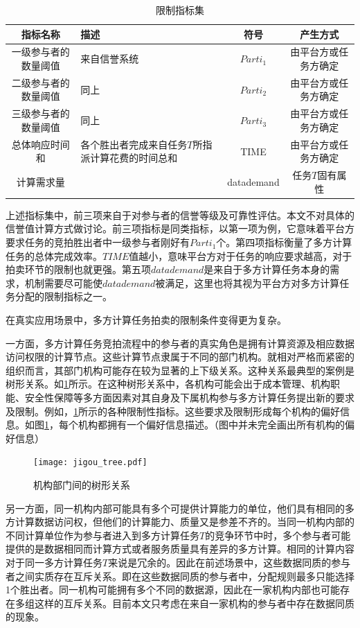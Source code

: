 \documentclass[promaster]{thesis-uestc}
\begin{document}
\begin{table}[h]
\caption{限制指标集}
\label{zhibiao}
\begin{tabular}{cp{10em}cc}
    \toprule
    指标名称& 描述&符号&产生方式\\
    \midrule
    一级参与者的数量阈值&来自信誉系统&$Parti_1$&由平台方或任务方确定\\
    二级参与者的数量阈值& 同上&$Parti_2$&由平台方或任务方确定\\
    三级参与者的数量阈值& 同上&$Parti_3$&由平台方或任务方确定\\
    总体响应时间和&各个胜出者完成来自任务$T$所指派计算花费的时间总和&TIME&由平台方或任务方确定\\
    计算需求量&&datademand&任务$T$固有属性\\
    \bottomrule
\end{tabular}
\end{table}

上述指标集中，前三项来自于对参与者的信誉等级及可靠性评估。本文不对具体的信誉值计算方式做讨论。前三项指标是同类指标，以第一项为例，它意味着平台方要求任务的竞拍胜出者中一级参与者刚好有$Parti_1$个。第四项指标衡量了多方计算任务的总体完成效率。$TIME$值越小，意味平台方对于任务的响应要求越高，对于拍卖环节的限制也就更强。第五项$datademand$是来自于多方计算任务本身的需求，机制需要尽可能使$datademand$被满足，这里也将其视为平台方对多方计算任务分配的限制指标之一。

在真实应用场景中，多方计算任务拍卖的限制条件变得更为复杂。

一方面，多方计算任务竞拍流程中的参与者的真实角色是拥有计算资源及相应数据访问权限的计算节点。这些计算节点隶属于不同的部门机构。就相对严格而紧密的组织而言，其部门机构可能存在较为显著的上下级关系。这种关系最典型的案例是树形关系。如\ref{jigoushu}所示。在这种树形关系中，各机构可能会出于成本管理、机构职能、安全性保障等多方面因素对其自身及下属机构参与多方计算任务提出新的要求及限制。例如，\ref{zhibiao}所示的各种限制性指标。这些要求及限制形成每个机构的偏好信息。如图\ref{jigoushu}，每个机构都拥有一个偏好信息描述。（图中并未完全画出所有机构的偏好信息）

\begin{figure}[h]
\center
    \texttt{[image: jigou\_tree.pdf]}
    \caption{机构部门间的树形关系}
    \label{jigoushu}
\end{figure}

另一方面，同一机构内部可能具有多个可提供计算能力的单位，他们具有相同的多方计算数据访问权，但他们的计算能力、质量又是参差不齐的。当同一机构内部的不同计算单位作为参与者进入到多方计算任务$T$的竞争环节中时，多个参与者可能提供的是数据相同而计算方式或者服务质量具有差异的多方计算。相同的计算内容对于同一多方计算任务$T$来说是冗余的。因此在前述场景中，这些数据同质的参与者之间实质存在互斥关系。即在这些数据同质的参与者中，分配规则最多只能选择1个胜出者。同一机构可能拥有多个不同的数据源，因此在一家机构内部也可能存在多组这样的互斥关系。目前本文只考虑在来自一家机构的参与者中存在数据同质的现象。
\end{document}
